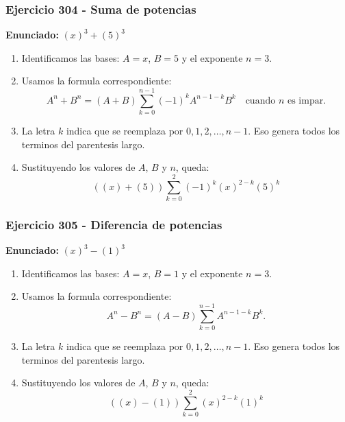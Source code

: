 \documentclass[11pt,a4paper]{article}
\begin{document}
\subsubsection*{Ejercicio 304 - Suma de potencias}
\textbf{Enunciado:} $ \left(x\right)^{3}+\left(5\right)^{3} $\par
\begin{enumerate}[leftmargin=2em]
\item Identificamos las bases: \(A=x\), \(B=5\) y el exponente \(n=3\).
\item Usamos la formula correspondiente: \[A^n+B^n=(A+B)\sum_{k=0}^{n-1}(-1)^kA^{n-1-k}B^k\quad\text{cuando }n\text{ es impar}.\]
\item La letra \(k\) indica que se reemplaza por \(0,1,2,\ldots,n-1\). Eso genera todos los terminos del parentesis largo.
\item Sustituyendo los valores de \(A\), \(B\) y \(n\), queda: \[\boxed{\left(\left(x\right)+\left(5\right)\right)\sum_{k=0}^{2}(-1)^k\left(x\right)^{2-k}\left(5\right)^k}\]
\end{enumerate}

\vspace{0.2cm}
\subsubsection*{Ejercicio 305 - Diferencia de potencias}
\textbf{Enunciado:} $ \left(x\right)^{3}-\left(1\right)^{3} $\par
\begin{enumerate}[leftmargin=2em]
\item Identificamos las bases: \(A=x\), \(B=1\) y el exponente \(n=3\).
\item Usamos la formula correspondiente: \[A^n-B^n=(A-B)\sum_{k=0}^{n-1}A^{n-1-k}B^k.\]
\item La letra \(k\) indica que se reemplaza por \(0,1,2,\ldots,n-1\). Eso genera todos los terminos del parentesis largo.
\item Sustituyendo los valores de \(A\), \(B\) y \(n\), queda: \[\boxed{\left(\left(x\right)-\left(1\right)\right)\sum_{k=0}^{2}\left(x\right)^{2-k}\left(1\right)^k}\]
\end{enumerate}

\vspace{0.2cm}
\end{document}
